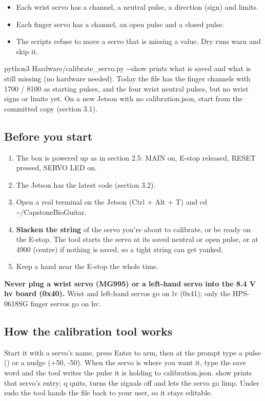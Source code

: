 \documentclass[11pt,letterpaper]{article}
\newcommand{\code}[1]{\textcolor{codeblue}{\ttfamily\smaller\relax #1}}
\begin{document}
\begin{itemize}
  \item Each wrist servo has a channel, a neutral pulse, a direction (sign) and limits.
  \item Each finger servo has a channel, an open pulse and a closed pulse.
  \item The scripts refuse to move a servo that is missing a value. Dry runs warn and skip it.
\end{itemize}

\code{python3 Hardware/\allowbreak{}calibrate\_\allowbreak{}servo.py -{}-{}show} prints what is saved and what is still missing (no hardware needed). Today the file has the finger channels with 1700 / 8100 as starting pulses, and the four wrist neutral pulses, but no wrist signs or limits yet. On a new Jetson with no \code{calibration.json}, start from the committed copy (section 3.1).


\subsection{Before you start}
\begin{enumerate}
  \item The box is powered up as in section 2.5: MAIN on, E-stop released, RESET pressed, SERVO LED on.
  \item The Jetson has the latest code (section 3.2).
  \item Open a real terminal on the Jetson (Ctrl + Alt + T) and \code{cd \textasciitilde{}/\allowbreak{}CapstoneBioGuitar}.
  \item \textbf{Slacken the string} of the servo you're about to calibrate, or be ready on the E-stop. The tool starts the servo at its saved neutral or open pulse, or at 4900 (centre) if nothing is saved, so a tight string can get yanked.
  \item Keep a hand near the E-stop the whole time.
\end{enumerate}

\begin{note}\textbf{Never plug a wrist servo (MG995) or a left-hand servo into the 8.4 V \code{hv} board (0x40).} Wrist and left-hand servos go on \code{lv} (0x41); only the HPS-0618SG finger servos go on \code{hv}.\end{note}

\subsection{How the calibration tool works}
Start it with a servo's name, press Enter to arm, then at the prompt type a pulse (\code{4900}) or a nudge (\code{+50}, \code{-{}50}). When the servo is where you want it, type the save word and the tool writes the pulse it is holding to \code{calibration.json}. \code{show} prints that servo's entry; \code{q} quits, turns the signals off and lets the servo go limp. Under sudo the tool hands the file back to your user, so it stays editable.
\end{document}
